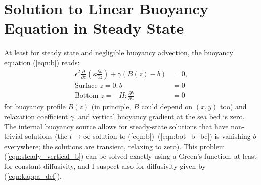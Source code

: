\documentclass[10pt]{amsart}
\begin{document}
\section{Solution to Linear Buoyancy Equation in Steady State}
\label{sec:b_solution}

At least for steady state and negligible buoyancy advection, the buoyancy equation (\ref{eqn:b}) reads:
\begin{align}
\epsilon^2 \frac{\partial }{\partial z} \left( \kappa \frac{\partial b}{\partial z} \right) + \gamma \left(  B(z) - b \right) & = 0, \label{eqn:steady_vertical_b} \\
\text{Surface~}z = 0:
b &= 0
 \\
\text{Bottom~}z = -H:
\frac{\partial b}{\partial z} &= 0
\end{align}
for buoyancy profile $B(z)$ (in principle, $B$ could depend on $(x,y)$ too) and relaxation coefficient $\gamma$, and vertical buoyancy gradient at the sea bed is zero. 
The internal buoyancy source allows for steady-state solutions that have non-trivial solutions (the $t\rightarrow \infty$ solution to (\ref{eqn:b})--(\ref{eqn:bot_b_bc}) is vanishing $b$ everywhere; the \citealt{peterson&callies26} solutions are transient, relaxing to zero).
This problem (\ref{eqn:steady_vertical_b}) can be solved exactly using a Green's function, at least for constant diffusivity, and I suspect also for diffusivity given by (\ref{eqn:kappa_def}). 
\end{document}
